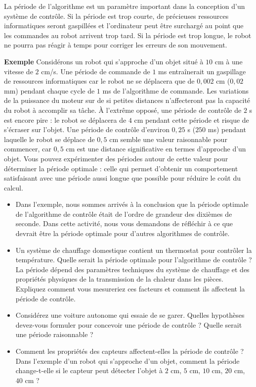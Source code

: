 La période de l'algorithme est un paramètre important dans la conception d'un système de contrôle. Si la période est trop courte, de précieuses ressources informatiques seront gaspillées et l'ordinateur peut être surchargé au point que les commandes au robot arrivent trop tard. Si la période est trop longue, le robot ne pourra pas réagir à temps pour corriger les erreurs de son mouvement.

\medskip

\noindent\textbf{Exemple} Considérons un robot qui s'approche d'un objet situé à $10$ cm à une vitesse de $2$ cm/s. Une période de commande de $1$ ms entraînerait un gaspillage de ressources informatiques car le robot ne se déplacera que de $0,002$ cm ($0,02$ mm) pendant chaque cycle de $1$ ms de l'algorithme de commande. Les variations de la puissance du moteur sur de si petites distances n'affecteront pas la capacité du robot à accomplir sa tâche. À l'extrême opposé, une période de contrôle de $2$ s est encore pire : le robot se déplacera de $4$ cm pendant cette période et risque de s'écraser sur l'objet. Une période de contrôle d'environ $0,25$ s ($250$ ms) pendant laquelle le robot se déplace de $0,5$ cm semble une valeur raisonnable pour commencer, car $0,5$ cm est une distance significative en termes d'approche d'un objet. Vous pouvez expérimenter des périodes autour de cette valeur pour déterminer la période optimale : celle qui permet d'obtenir un comportement satisfaisant avec une période aussi longue que possible pour réduire le coût du calcul.

\begin{framed}
\begin{itemize}
\item Dans l'exemple, nous sommes arrivés à la conclusion que la période optimale de l'algorithme de contrôle était de l'ordre de grandeur des dixièmes de seconde. Dans cette activité, nous vous demandons de réfléchir à ce que devrait être la période optimale pour d'autres algorithmes de contrôle.
\item Un système de chauffage domestique contient un thermostat pour contrôler la température. Quelle serait la période optimale pour l'algorithme de contrôle ? La période dépend des paramètres techniques du système de chauffage et des propriétés physiques de la transmission de la chaleur dans les pièces. Expliquez comment vous mesureriez ces facteurs et comment ils affectent la période de contrôle.
\item Considérez une voiture autonome qui essaie de se garer. Quelles hypothèses devez-vous formuler pour concevoir une période de contrôle ? Quelle serait une période raisonnable ?
\item Comment les propriétés des capteurs affectent-elles la période de contrôle ? Dans l'exemple d'un robot qui s'approche d'un objet, comment la période change-t-elle si le capteur peut détecter l'objet à $2$ cm, $5$ cm, $10$ cm, $20$ cm, $40$ cm ?
\end{itemize}
\end{framed}

